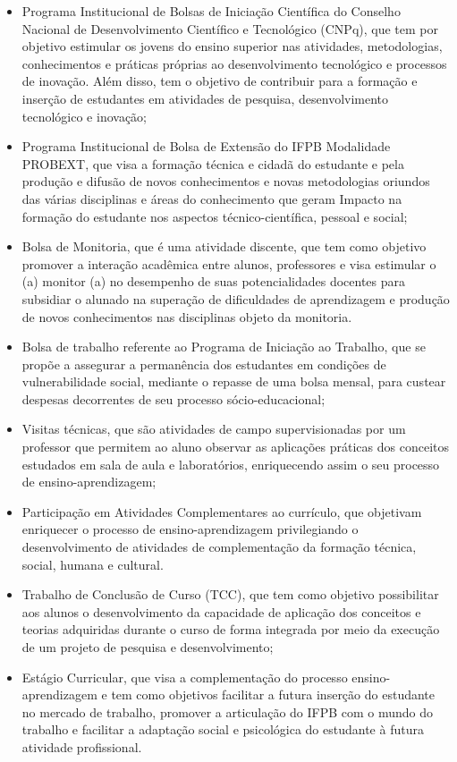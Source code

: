 \begin{itemize}
\item Programa Institucional de Bolsas de Iniciação Científica do Conselho Nacional de Desenvolvimento Científico e Tecnológico (CNPq), que tem por objetivo estimular os jovens do ensino superior nas atividades, metodologias, conhecimentos e práticas próprias ao desenvolvimento tecnológico e processos de inovação. Além disso, tem o objetivo de contribuir para a formação e inserção de estudantes em atividades de pesquisa, desenvolvimento tecnológico e inovação;

\item Programa Institucional de Bolsa de Extensão do IFPB Modalidade PROBEXT, que visa a formação técnica e cidadã do estudante e pela produção e difusão de novos conhecimentos e novas metodologias oriundos das várias disciplinas e áreas do conhecimento que geram Impacto na formação do estudante nos aspectos técnico-científica, pessoal e social;

\item Bolsa de Monitoria, que é uma atividade discente, que tem como objetivo promover a interação acadêmica entre alunos, professores e visa estimular o (a) monitor (a) no desempenho de suas potencialidades docentes para subsidiar o alunado na superação de dificuldades de aprendizagem e produção de novos conhecimentos nas disciplinas objeto da monitoria.

\item Bolsa de trabalho referente ao Programa de Iniciação ao Trabalho, que se propõe a assegurar a permanência dos estudantes em condições de vulnerabilidade social, mediante o repasse de uma bolsa mensal, para custear despesas decorrentes de seu processo sócio-educacional;

\item Visitas técnicas, que são atividades de campo supervisionadas por um professor que permitem ao aluno observar as aplicações práticas dos conceitos estudados em sala de aula e laboratórios, enriquecendo assim o seu processo de ensino-aprendizagem;


\item Participação em Atividades Complementares ao currículo, que objetivam enriquecer o processo de ensino-aprendizagem privilegiando o desenvolvimento de atividades de complementação da formação técnica, social, humana e cultural.

\item Trabalho de Conclusão de Curso (TCC), que tem como objetivo possibilitar aos alunos o desenvolvimento da capacidade de aplicação dos conceitos e teorias adquiridas durante o curso de forma integrada por meio da execução de um projeto de pesquisa e desenvolvimento;

\item Estágio Curricular, que visa a complementação do processo ensino-aprendizagem e tem como objetivos facilitar a futura inserção do estudante no mercado de trabalho, promover a articulação do IFPB com o mundo do trabalho e facilitar a adaptação social e psicológica do estudante à futura atividade profissional.

\end{itemize}

